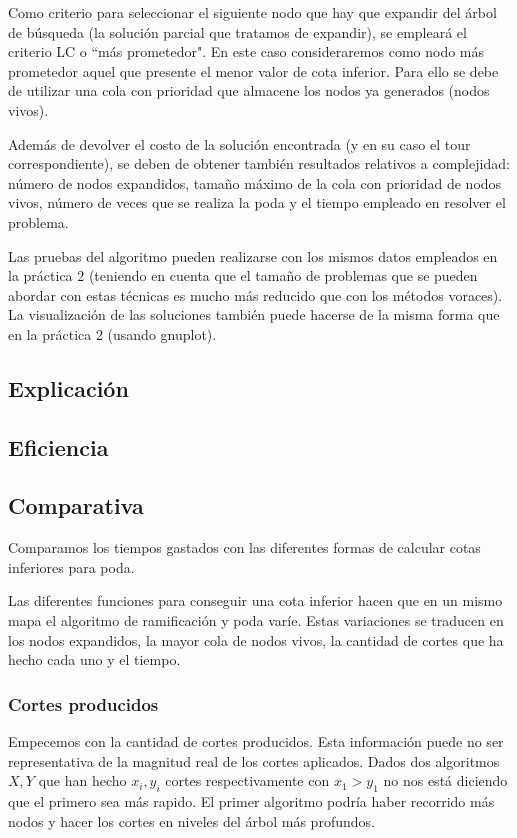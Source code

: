 Como criterio para seleccionar el siguiente nodo que hay que expandir del árbol de búsqueda
(la solución parcial que tratamos de expandir), se empleará el criterio LC o ``más prometedor".
En este caso consideraremos como nodo más prometedor aquel que presente el menor valor de
cota inferior. Para ello se debe de utilizar una cola con prioridad que almacene los nodos ya
generados (nodos vivos).

Además de devolver el costo de la solución encontrada (y en su caso el tour correspondiente),
se deben de obtener también resultados relativos a complejidad: número de nodos expandidos,
tamaño máximo de la cola con prioridad de nodos vivos, número de veces que se realiza la poda
y el tiempo empleado en resolver el problema.

Las pruebas del algoritmo pueden realizarse con los mismos datos empleados en la práctica
$2$ (teniendo en cuenta que el tamaño de problemas que se pueden abordar con estas técnicas es
mucho más reducido que con los métodos voraces). La visualización de las soluciones también
puede hacerse de la misma forma que en la práctica $2$ (usando gnuplot).

\subsection{Explicación}



\subsection{Eficiencia}



\subsection{Comparativa}
Comparamos los tiempos gastados con las diferentes formas de calcular cotas inferiores para poda.

Las diferentes funciones para conseguir una cota inferior hacen que en un mismo mapa
el algoritmo de ramificación y poda varíe. 
Estas variaciones se traducen en los nodos expandidos, la mayor cola de nodos vivos, la cantidad de
cortes que ha hecho cada uno y el tiempo.


\subsubsection{Cortes producidos}
Empecemos con la cantidad de cortes producidos. Esta información puede no ser representativa de la
magnitud real de los cortes aplicados. Dados dos algoritmos $X,Y$ que han hecho $x_i,y_i$ cortes
respectivamente con $x_1>y_1$ no nos está diciendo que el primero sea más rapido.
El primer algoritmo podría haber recorrido más nodos y hacer los cortes en niveles del árbol más profundos. 


